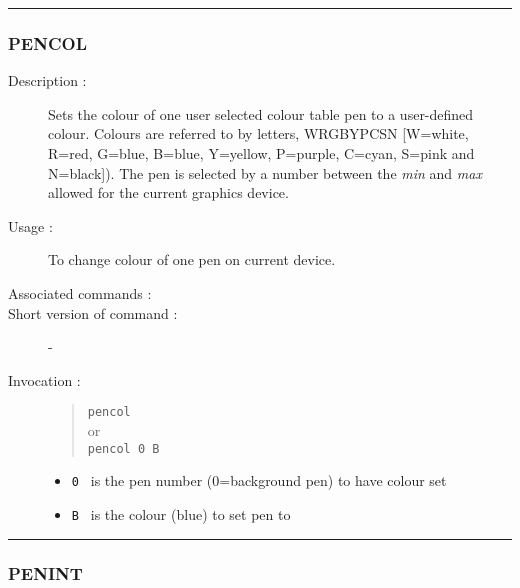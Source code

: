 \hrule 
\subsubsection*{\label{PENCOL}PENCOL}

\begin{description}

\item[Description :] Sets the colour of one user selected colour table
pen to a user-defined colour.  Colours are referred to by letters,
WRGBYPCSN [W=white, R=red, G=blue, B=blue, Y=yellow, P=purple, C=cyan,
S=pink and N=black]).  The pen is selected by a number between the {\it
min} and {\it max} allowed for the current graphics device.

\item[Usage :] To change colour of one pen on current device.
\item[Associated commands :] {\tt {}}
\item[Short version of command :] -
\item[Invocation :]

\begin{quote}{\tt  pencol }\\
or \\
{\tt pencol 0 B }
\end{quote}

\begin{itemize}

\item {\tt 0 } is the pen number (0=background pen) to have colour set
\item {\tt B } is the colour (blue) to set pen to
\end{itemize}

\end{description}

\hrule 
\subsubsection*{\label{PENINT}PENINT}

